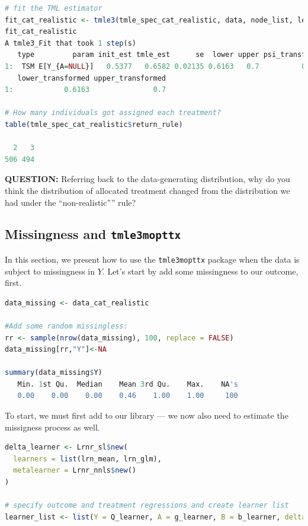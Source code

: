 \documentclass[
  12pt, krantz2,
]{krantz}
\newcommand{\passthrough}[1]{#1}
\newcommand{\1}{\mathbbm{1}}
\theoremstyle{definition}
\theoremstyle{definition}
\theoremstyle{definition}
\theoremstyle{definition}
\theoremstyle{remark}
\begin{document}
\begin{lstlisting}[language=R]
# fit the TML estimator
fit_cat_realistic <- tmle3(tmle_spec_cat_realistic, data, node_list, learner_list)
fit_cat_realistic
A tmle3_Fit that took 1 step(s)
   type         param init_est tmle_est      se  lower upper psi_transformed
1:  TSM E[Y_{A=NULL}]   0.5377   0.6582 0.02135 0.6163   0.7          0.6582
   lower_transformed upper_transformed
1:            0.6163               0.7

# How many individuals got assigned each treatment?
table(tmle_spec_cat_realistic$return_rule)

  2   3 
506 494 
\end{lstlisting}

\textbf{QUESTION:} Referring back to the data-generating distribution, why do you
think the distribution of allocated treatment changed from the distribution
we had under the ``non-realistic'''' rule?

\hypertarget{missingness-and-tmle3mopttx}{%
\subsection{\texorpdfstring{Missingness and \texttt{tmle3mopttx}}{Missingness and tmle3mopttx}}\label{missingness-and-tmle3mopttx}}

In this section, we present how to use the \passthrough{\lstinline!tmle3mopttx!} package when the data is subject
to missingness in \(Y\). Let's start by add some missingness to our outcome, first.

\begin{lstlisting}[language=R]
data_missing <- data_cat_realistic

#Add some random missingless:
rr <- sample(nrow(data_missing), 100, replace = FALSE)
data_missing[rr,"Y"]<-NA

summary(data_missing$Y)
   Min. 1st Qu.  Median    Mean 3rd Qu.    Max.    NA's 
   0.00    0.00    0.00    0.46    1.00    1.00     100 
\end{lstlisting}

To start, we must first add to our library --- we now also need to estimate the
missigness process as well.

\begin{lstlisting}[language=R]
delta_learner <- Lrnr_sl$new(
  learners = list(lrn_mean, lrn_glm),
  metalearner = Lrnr_nnls$new()
)

# specify outcome and treatment regressions and create learner list
learner_list <- list(Y = Q_learner, A = g_learner, B = b_learner, delta_Y=delta_learner)
\end{lstlisting}
\end{document}
